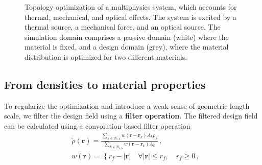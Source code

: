     \begin{figure}[bt]
      \centering
      \caption{Topology optimization of a multiphysics system, which accounts for thermal, mechanical, and optical effects. The system is excited by a thermal source, a mechanical force, and an optical source. The simulation domain comprises a passive domain (white) where the material is fixed, and a design domain (grey), where the material distribution is optimized for two different materials.}
          \label{fig:top_opt_multi}
   \end{figure}

    \subsection*{From densities to material properties}
    To regularize the optimization and introduce a weak sense of geometric length
    scale, we filter
    the design field using a \textbf{filter operation}. The filtered design field can
    be calculated using a
    convolution-based filter operation~\cite{projection}
       \begin{equation}\label{eq:filter_conv}
           \begin{aligned}
                & \tilde{\rho}(\mathbf{r})=\frac{\sum_{k \in \mathcal{B}_{e, h}}
    w\left(\mathbf{r}-\mathbf{r}_k\right) A_k \rho_k}{\sum_{k \in \mathcal{B}_{e,
    h}} w\left(\mathbf{r}-\mathbf{r}_k\right) A_k}\,,                              \\
                & w(\mathbf{r})=\left\{r_f-|\mathbf{r}| \quad \forall|\mathbf{r}| \leq r_f,
    \quad r_f \geq 0\right.\,,
           \end{aligned}
       \end{equation}
   
